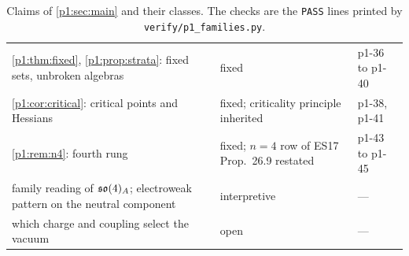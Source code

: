 \begin{table}[t]
\begin{tabular}{@{}>{\raggedright\arraybackslash}p{8.4cm}>{\raggedright\arraybackslash}p{4.3cm}>{\raggedright\arraybackslash}p{2.2cm}@{}}
\cref{p1:thm:fixed}, \cref{p1:prop:strata}: fixed sets, unbroken algebras & fixed & p1-36 to p1-40\\
\cref{p1:cor:critical}: critical points and Hessians & fixed; criticality principle inherited & p1-38, p1-41\\
\cref{p1:rem:n4}: fourth rung & fixed; $n=4$ row of ES17 Prop.~26.9 restated & p1-43 to p1-45\\
family reading of $\mathfrak{so}(4)_A$; electroweak pattern on the neutral component & interpretive & ---\\
which charge and coupling select the vacuum & open & ---\\
\bottomrule
\end{tabular}
\caption{Claims of \cref{p1:sec:main} and their classes. The checks are the \texttt{PASS} lines printed by \texttt{verify/p1\_families.py}.}
\label{p1:tab:claims}
\end{table}
